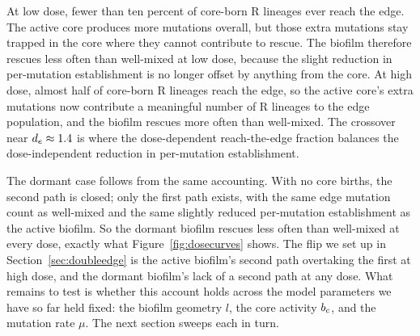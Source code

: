 At low dose, fewer than ten percent of core-born R lineages ever reach the edge. The active core produces more mutations overall, but those extra mutations stay trapped in the core where they cannot contribute to rescue. The biofilm therefore rescues less often than well-mixed at low dose, because the slight reduction in per-mutation establishment is no longer offset by anything from the core. At high dose, almost half of core-born R lineages reach the edge, so the active core's extra mutations now contribute a meaningful number of R lineages to the edge population, and the biofilm rescues more often than well-mixed. The crossover near $d_e \approx 1.4$ is where the dose-dependent reach-the-edge fraction balances the dose-independent reduction in per-mutation establishment.

The dormant case follows from the same accounting. With no core births, the second path is closed; only the first path exists, with the same edge mutation count as well-mixed and the same slightly reduced per-mutation establishment as the active biofilm. So the dormant biofilm rescues less often than well-mixed at every dose, exactly what Figure~\ref{fig:dosecurves} shows. The flip we set up in Section~\ref{sec:doubleedge} is the active biofilm's second path overtaking the first at high dose, and the dormant biofilm's lack of a second path at any dose. What remains to test is whether this account holds across the model parameters we have so far held fixed: the biofilm geometry $l$, the core activity $b_c$, and the mutation rate $\mu$. The next section sweeps each in turn.

